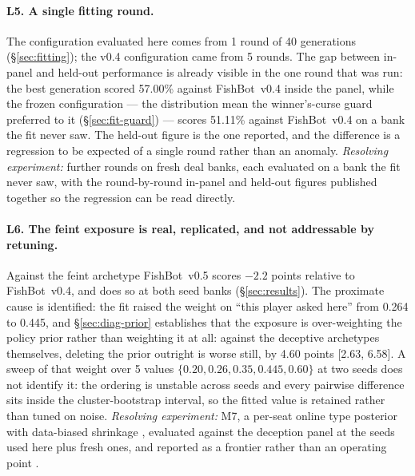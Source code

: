 \documentclass[11pt]{article}
\theoremstyle{definition}
\DeclareRobustCommand{\vfive}{\texorpdfstring{\mbox{FishBot v0.5}}{FishBot v0.5}}
\DeclareRobustCommand{\vfour}{\texorpdfstring{\mbox{FishBot v0.4}}{FishBot v0.4}}
\providecommand{\numPanelVfiveVfour}{51.11}
\providecommand{\numDecFeintDelta}{-2.2}
\providecommand{\numThetaSweep}{0.20, 0.26, 0.35, 0.445, 0.60}
\providecommand{\numThetaSweepN}{5}
\providecommand{\numPriorThetaFour}{0.264}
\providecommand{\numPriorThetaFive}{0.445}
\providecommand{\numFitRounds}{1}
\providecommand{\numFitGens}{40}
\providecommand{\numFitWorst}{57.00}
\providecommand{\numVfourFitRounds}{5}
\providecommand{\numPriorDeleteCI}{2.63, 6.58}
\providecommand{\numPriorDeleteCost}{4.60}
\begin{document}
\paragraph{L5. A single fitting round.} The configuration evaluated here comes
from \numFitRounds{} round of \numFitGens{} generations
(\S\ref{sec:fitting}); the v0.4 configuration came from
\numVfourFitRounds{} rounds.
The gap between in-panel and held-out performance is already visible in the one
round that was run: the best generation scored \numFitWorst\% against \vfour{}
inside the panel, while the frozen configuration --- the distribution mean the
winner's-curse guard preferred to it (\S\ref{sec:fit-guard}) --- scores
\numPanelVfiveVfour\% against \vfour{} on a bank the fit never saw.
The held-out figure is the one reported, and the difference is a regression to be
expected of a single round rather than an anomaly. \emph{Resolving experiment:}
further rounds on fresh deal banks, each evaluated on a bank the fit never saw,
with the round-by-round in-panel and held-out figures published together so the
regression can be read directly.

\paragraph{L6. The feint exposure is real, replicated, and not addressable by
retuning.} Against the feint archetype \vfive{} scores $\numDecFeintDelta$
points relative to \vfour{}, and does so at both seed banks
(\S\ref{sec:results}). The proximate
cause is identified: the fit raised the weight on ``this player asked here'' from
\numPriorThetaFour{} to \numPriorThetaFive{}, and \S\ref{sec:diag-prior}
establishes that the exposure is over-weighting the policy prior rather than
weighting it at all: against the deceptive archetypes themselves, deleting the
prior outright is worse still, by
\numPriorDeleteCost{} points [\numPriorDeleteCI]. A sweep of that weight over \numThetaSweepN{} values
$\{\numThetaSweep\}$ at two seeds does not identify it: the ordering is unstable
across seeds and every pairwise difference sits inside the cluster-bootstrap
interval, so the fitted value is retained rather than tuned on noise.
\emph{Resolving experiment:} M7, a per-seat online type posterior with
data-biased shrinkage \cite{johanson-dbr}, evaluated against the deception panel
at the seeds used here plus fresh ones, and reported as a frontier rather than an
operating point \cite{johanson-rnash}.
\end{document}
